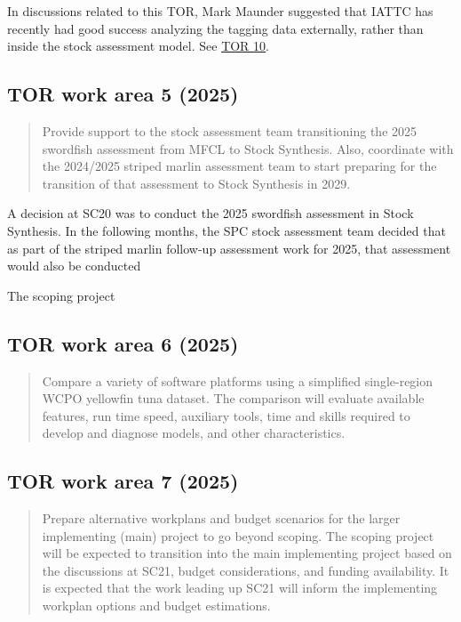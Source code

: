 \documentclass{SCreport}
\begin{document}
In discussions related to this TOR, Mark Maunder suggested that IATTC has
recently had good success analyzing the tagging data externally, rather than
inside the stock assessment model. See \hyperlink{link:tagging-index}{TOR 10}.

\vspace{1ex}

\subsection{TOR work area 5 (2025)}


\begin{quote}\sf
  Provide support to the stock assessment team transitioning the 2025 swordfish
  assessment from MFCL to Stock Synthesis. Also, coordinate with the 2024/2025
  striped marlin assessment team to start preparing for the transition of that
  assessment to Stock Synthesis in 2029.
\end{quote}

A decision at SC20 was to conduct the 2025 swordfish assessment in Stock
Synthesis. In the following months, the SPC stock assessment team decided that
as part of the striped marlin follow-up assessment work for 2025, that
assessment would also be conducted

The scoping project

\subsection{TOR work area 6 (2025)}

\begin{quote}\sf
  Compare a variety of software platforms using a simplified single-region WCPO
  yellowfin tuna dataset. The comparison will evaluate available features, run
  time speed, auxiliary tools, time and skills required to develop and diagnose
  models, and other characteristics.
\end{quote}

\subsection{TOR work area 7 (2025)}

\begin{quote}
  Prepare alternative workplans and budget scenarios for the larger implementing
  (main) project to go beyond scoping. The scoping project will be expected to
  transition into the main implementing project based on the discussions at
  SC21, budget considerations, and funding availability. It is expected that the
  work leading up SC21 will inform the implementing workplan options and budget
  estimations.
\end{quote}
\end{document}
